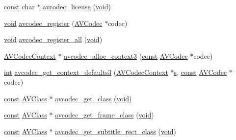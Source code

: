 \begin{DoxyCompactItemize}
\item 
\hyperlink{getopt1_8c_a2c212835823e3c54a8ab6d95c652660e}{const} char $\ast$ \hyperlink{group__lavc__core_gae594db5f65482502088cba133ff96352}{avcodec\+\_\+license} (\hyperlink{sound_8c_ae35f5844602719cf66324f4de2a658b3}{void})
\item 
\hyperlink{sound_8c_ae35f5844602719cf66324f4de2a658b3}{void} \hyperlink{group__lavc__core_ga882513208349dbcea177626d9fd7ed92}{avcodec\+\_\+register} (\hyperlink{struct_a_v_codec}{A\+V\+Codec} $\ast$codec)
\item 
\hyperlink{sound_8c_ae35f5844602719cf66324f4de2a658b3}{void} \hyperlink{group__lavc__core_gaf1a2bb4e7c7611c131bb6212bf0fa639}{avcodec\+\_\+register\+\_\+all} (\hyperlink{sound_8c_ae35f5844602719cf66324f4de2a658b3}{void})
\item 
\hyperlink{struct_a_v_codec_context}{A\+V\+Codec\+Context} $\ast$ \hyperlink{group__lavc__core_gae80afec6f26df6607eaacf39b561c315}{avcodec\+\_\+alloc\+\_\+context3} (\hyperlink{getopt1_8c_a2c212835823e3c54a8ab6d95c652660e}{const} \hyperlink{struct_a_v_codec}{A\+V\+Codec} $\ast$codec)
\item 
\hyperlink{xmltok_8h_a5a0d4a5641ce434f1d23533f2b2e6653}{int} \hyperlink{group__lavc__core_ga1dd4bf43e6a4ec8b8d76bd3673e5e73a}{avcodec\+\_\+get\+\_\+context\+\_\+defaults3} (\hyperlink{struct_a_v_codec_context}{A\+V\+Codec\+Context} $\ast$\hyperlink{lib_2expat_8h_a755339d27872b13735c2cab829e47157}{s}, \hyperlink{getopt1_8c_a2c212835823e3c54a8ab6d95c652660e}{const} \hyperlink{struct_a_v_codec}{A\+V\+Codec} $\ast$codec)
\item 
\hyperlink{getopt1_8c_a2c212835823e3c54a8ab6d95c652660e}{const} \hyperlink{struct_a_v_class}{A\+V\+Class} $\ast$ \hyperlink{group__lavc__core_gae8ab0faa9a07901c48e07e5feee82626}{avcodec\+\_\+get\+\_\+class} (\hyperlink{sound_8c_ae35f5844602719cf66324f4de2a658b3}{void})
\item 
\hyperlink{getopt1_8c_a2c212835823e3c54a8ab6d95c652660e}{const} \hyperlink{struct_a_v_class}{A\+V\+Class} $\ast$ \hyperlink{group__lavc__core_gad55dfc8e9e168e498ab053b38ba6dec8}{avcodec\+\_\+get\+\_\+frame\+\_\+class} (\hyperlink{sound_8c_ae35f5844602719cf66324f4de2a658b3}{void})
\item 
\hyperlink{getopt1_8c_a2c212835823e3c54a8ab6d95c652660e}{const} \hyperlink{struct_a_v_class}{A\+V\+Class} $\ast$ \hyperlink{group__lavc__core_ga4a9d3dc85f704795638b7be320fbc357}{avcodec\+\_\+get\+\_\+subtitle\+\_\+rect\+\_\+class} (\hyperlink{sound_8c_ae35f5844602719cf66324f4de2a658b3}{void})
\item 

\end{DoxyCompactItemize}
